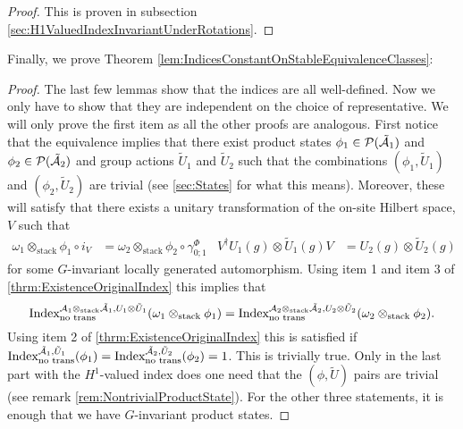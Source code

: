 \documentclass[11pt,a4paper,twoside]{article}
\numberwithin{equation}{section}
\begin{document}
	\begin{proof}
		This is proven in subsection \ref{sec:H1ValuedIndexInvariantUnderRotations}.
	\end{proof}
	Finally, we prove Theorem \ref{lem:IndicesConstantOnStableEquivalenceClasses}:
	\begin{proof}
		The last few lemmas show that the indices are all well-defined. Now we only have to show that they are independent on the choice of representative.	We will only prove the first item as all the other proofs are analogous. First notice that the equivalence implies that there exist product states $\phi_1\in\PP(\tilde\AA_1)$ and $\phi_2\in\PP(\tilde\AA_2)$ and group actions $\tilde U_1$ and $\tilde U_2$ such that the combinations $(\phi_1,\tilde U_1)$ and $(\phi_2,\tilde U_2)$ are trivial (see \ref{sec:States} for what this means). Moreover, these will satisfy that there exists a unitary transformation of the on-site Hilbert space, $V$ such that
		\begin{align}
			\omega_1\otimes_{\text{stack}}\phi_1\circ i_V&=\omega_2\otimes_{\text{stack}}\phi_2\circ\gamma^\Phi_{0;1}&V^\dagger U_{1}(g)\otimes \tilde{U}_{1}(g)V&=U_{2}(g)\otimes \tilde{U}_{2}(g)
		\end{align}
		for some $G$-invariant locally generated automorphism. Using item 1 and item 3 of \ref{thrm:ExistenceOriginalIndex} this implies that
		\begin{equation}
			\textrm{Index}^{\AA_1\otimes_{\text{stack}}\tilde \AA_1,U_1\otimes \tilde U_1}_{\text{no trans}}(\omega_1\otimes_{\text{stack}}\phi_1) =\textrm{Index}^{\AA_2\otimes_{\text{stack}}\tilde \AA_2,U_2\otimes\tilde U_2}_{\text{no trans}}(\omega_2\otimes_{\text{stack}}\phi_2).
		\end{equation}
		Using item 2 of \ref{thrm:ExistenceOriginalIndex} this is satisfied if $\textrm{Index}^{\tilde \AA_1,\tilde U_1}_{\text{no trans}}(\phi_1)=\textrm{Index}^{\tilde \AA_2,\tilde U_2}_{\text{no trans}}(\phi_2)=1$. This is trivially true. Only in the last part with the $H^1$-valued index does one need that the $(\phi,\tilde U)$ pairs are trivial (see remark \ref{rem:NontrivialProductState}). For the other three statements, it is enough that we have $G$-invariant product states.
	\end{proof}
	
	
\end{document}
